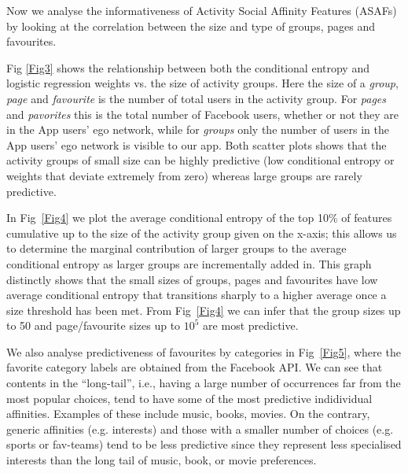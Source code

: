 


Now we analyse the informativeness of Activity Social Affinity
Features (ASAFs) by looking at the correlation between the size and
type of groups, pages and favourites.

Fig \ref{Fig3} shows the relationship between both the conditional
    entropy and logistic regression weights vs. the size of activity
    groups. Here the size of a {\em group}, {\em page} and {\em favourite} 
    is the number of total users in the activity group. 
    For {\em pages} and {\em pavorites} this is the total number of Facebook users, 
    whether or not they are in the App users' ego network, while for 
    {\em groups} only the number of users in the App users' ego network is visible to our app.
    Both scatter plots shows that the activity groups of small size can be
    highly predictive (low conditional entropy or weights that deviate
    extremely from zero) whereas large groups are rarely predictive.

In Fig~\ref{Fig4} we plot the average conditional entropy of the top
    10\% of features cumulative up to the size of the activity group given on the
    x-axis; this allows us to determine the marginal contribution of
    larger groups to the average conditional entropy as larger groups
    are incrementally added in.  This graph 
    distinctly shows that the small sizes of groups, pages and favourites
    have low average conditional entropy that transitions sharply to a
    higher average once a size threshold has been met.  From 
    Fig~\ref{Fig4} we can infer that the group sizes up to 50 and
    page/favourite sizes up to $10^{5}$ are most predictive.


 We also analyse predictiveness of favourites by categories in
    Fig~\ref{Fig5}, where the favorite category labels are obtained from the Facebook API.  
    We can see that contents in the ``long-tail'', i.e.,  
    having a large number of occurrences far from the most popular choices, 
    tend to have some of the most predictive indidividual affinities. Examples of these include
    music, books, movies. On the contrary, generic affinities (e.g. interests) and 
    those with a smaller number of choices (e.g. sports or fav-teams) 
    tend to be less predictive since they represent less specialised interests than 
    the long tail of music, book, or movie preferences.  

